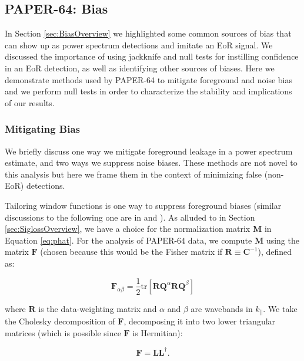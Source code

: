 \documentclass[preprint2,numberedappendix,tighten]{aastex6}  %
\begin{document}

\subsection{PAPER-64: Bias}
\label{sec:Bias}

In Section \ref{sec:BiasOverview} we highlighted some common sources of bias that can show up as power spectrum 
detections and imitate an EoR signal. We discussed the importance of using jackknife and null tests for instilling confidence in an EoR 
detection, as well as identifying other sources of biases. Here we demonstrate methods used by PAPER-64 to mitigate 
foreground and noise bias and we perform null tests in order to characterize the stability and implications of our results.

\subsubsection{Mitigating Bias}
\label{sec:MitBias}

We briefly discuss one way we mitigate foreground leakage in a power spectrum estimate, and two ways we 
suppress noise biases. These methods are not novel to this analysis but here we frame them in the context of minimizing false 
(non-EoR) detections. 

Tailoring window functions is one way to suppress foreground biases (similar discussions to the following one are in \citet{liu_et_al2014b} and ). As alluded to in Section \ref{sec:SiglossOverview}, we 
have a choice for the normalization matrix $\textbf{M}$ in Equation \eqref{eq:phat}. For the analysis of PAPER-64 data, we 
compute $\textbf{M}$ using the matrix $\textbf{F}$ (chosen because this would be the Fisher matrix if $\textbf{R} \equiv \textbf{C}^{-1}$), defined as:

\begin{equation}
\textbf{F}_{\alpha\beta} = \frac{1}{2} \text{tr} [\textbf{R}\textbf{Q}^{\alpha}\textbf{R}\textbf{Q}^{\beta} ]
\end{equation}

\noindent where $\textbf{R}$ is the data-weighting matrix and $\alpha$ and $\beta$ are wavebands in $k_{\parallel}$. We take 
the Cholesky decomposition of $\textbf{F}$, decomposing it into two lower triangular matrices (which is possible since $\textbf{F}$ is Hermitian):

\begin{equation}
\textbf{F} = \textbf{LL}^{\dagger}.
\end{equation}
\end{document}
